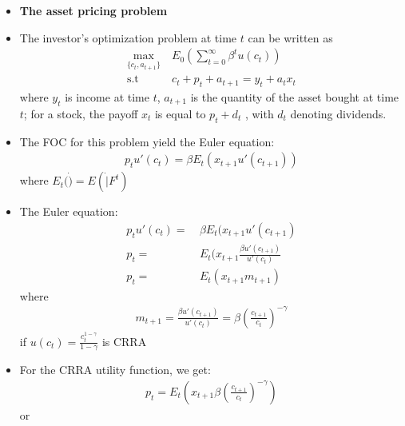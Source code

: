 \documentclass[a4paper,twoside,11pt]{article}
\begin{document}
\begin{itemize}
    \item \textbf{The asset pricing problem}
    \item The investor's optimization problem at time $t$ can be written as
\begin{equation*}
\begin{aligned}
\underset{\{c_t,a_{t+1}\}}{\max}& \  E_0 (\sum^{\infty}_{t=0} \beta^t u(c_t)) \\
\text{s.t}& \ c_t + p_t + a_{t+1} = y_t + a_t x_t
\end{aligned} 
\end{equation*}
where $y_t$ is income at time $t$, $a_{t+1}$ is the quantity of the asset bought at time $t$; for a stock, the payoff $x_t$ is equal to $p_t + d_t$ , with $d_t$ denoting dividends.
    \item The FOC for this problem yield the Euler equation:
\begin{equation*}
\begin{aligned}
p_t u'(c_t) = \beta E_t (x_{t+1} u' (c_{t+1}))
\end{aligned} 
\end{equation*}
where $E_t(\dot) = E(\dot |F^t)$
    \item The Euler equation:
\begin{equation*}
\begin{aligned}
p_t u'(c_t) =& \ \beta E_t (x_{t+1} u'(c_{t+1}) \\
p_t =& \ E_t(x_{t+1} \frac{\beta u'(c_{t+1})}{u'(c_t)} \\
p_t =& \ E_t(x_{t+1} m_{t+1})
\end{aligned} 
\end{equation*}
where
\begin{equation*}
\begin{aligned}
m_{t+1} = \frac{\beta u' (c_{t+1})}{u' (c_t)} = \beta (\frac{c_{t+1}}{c_t})^{-\gamma}
\end{aligned} 
\end{equation*}
if $u(c_t) = \frac{c_t^{1-\gamma}}{1-\gamma}$ is CRRA
    \item For the CRRA utility function, we get:
\begin{equation*}
\begin{aligned}
p_t = E_t (x_{t+1} \beta( \frac{c_{t+1}}{c_t})^{-\gamma})
\end{aligned} 
\end{equation*}
or
\begin{equation*}
\begin{aligned}

\end{aligned}
\end{equation*}
\end{itemize}
\end{document}
